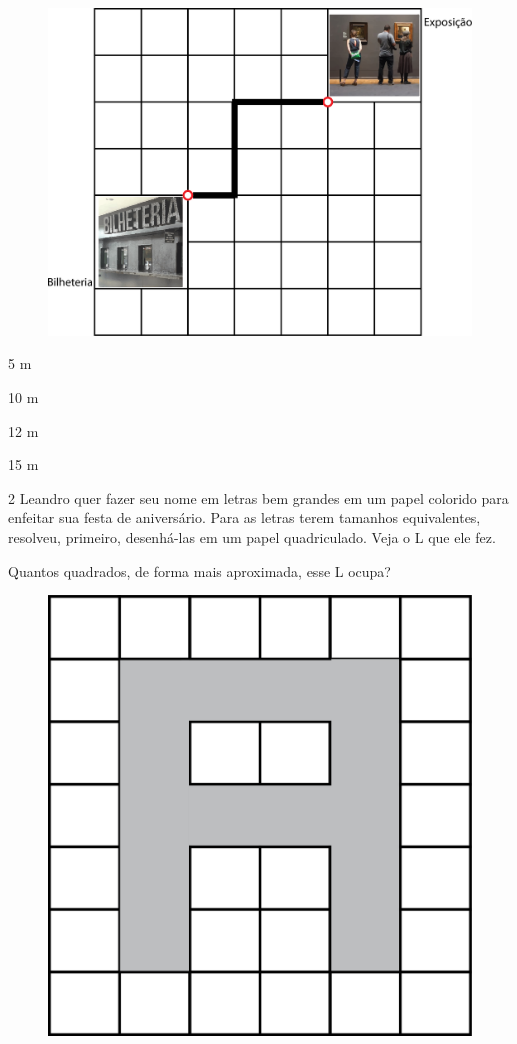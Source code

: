 \begin{figure}[htpb!]
\includegraphics[width=\textwidth]{./media/image61.png}
\end{figure}

\begin{escolha}
\item
  5 m
\item
  10 m
\item
  12 m
\item
  15 m
\end{escolha}

\num{2} Leandro quer fazer seu nome em letras bem grandes em um papel colorido para enfeitar sua festa de aniversário. Para as letras terem tamanhos equivalentes, resolveu, primeiro, desenhá-las em um papel quadriculado. Veja o L que ele fez.

Quantos quadrados, de forma mais aproximada, esse L ocupa?

\begin{figure}[htpb!]
\centering
\includegraphics[width=.8\textwidth]{./media/image62.png}
\end{figure}


